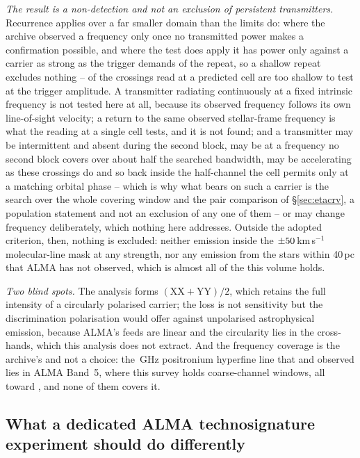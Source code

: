 \noindent\emph{The result is a non-detection and not an exclusion of persistent
transmitters.} Recurrence applies over a far smaller domain than the limits do:
where the archive observed a frequency only once no transmitted power makes a
confirmation possible, and where the test does apply it has power only against
a carrier as strong as the trigger demands of the repeat, so a shallow repeat
excludes nothing -- \HjNPowerLo{} of the \RcNExcl{} crossings read at a
predicted cell are too shallow to test at the trigger amplitude. A transmitter
radiating continuously at a fixed intrinsic frequency is not tested here at
all, because its observed frequency follows its own line-of-sight velocity; a
return to the same observed stellar-frame frequency is what the reading at a
single cell tests, and it is not found; and a transmitter may be intermittent
and absent during the second block, may be at a frequency no second block
covers over about half the searched bandwidth, may be accelerating as these
crossings do and so back inside the half-channel the cell permits only at a
matching orbital phase -- which is why what bears on such a carrier is the
search over the whole covering window and the pair comparison of
\S\ref{sec:etacrv}, a population statement and not an exclusion of any one of
them -- or may change frequency deliberately, which nothing here addresses.
Outside the adopted criterion, then, nothing is excluded: neither emission
inside the $\pm50$\,km\,s$^{-1}$ molecular-line mask at any strength,
nor any emission from the stars within 40\,pc that ALMA has not observed, which
is almost all of the \NGaiaCensus{} this volume holds.

\noindent\emph{Two blind spots.} The analysis forms
$(\mathrm{XX}+\mathrm{YY})/2$, which retains the full intensity of a circularly
polarised carrier; the loss is not sensitivity but the discrimination
polarisation would offer against unpolarised astrophysical emission, because
ALMA's feeds are linear and the circularity lies in the cross-hands, which this
analysis does not extract. And the frequency coverage is the archive's and not a
choice: the \SbPriorFreqGHz\,GHz positronium hyperfine line that
\citet{Steffes1994} and \citet{Mauersberger1996} observed lies in ALMA Band~5,
where this survey holds \LnBFiveWin{} coarse-channel windows, all toward
\LnBFiveStars, and none of them covers it.

\subsection{What a dedicated ALMA technosignature experiment should do
differently}
\label{sec:future}

